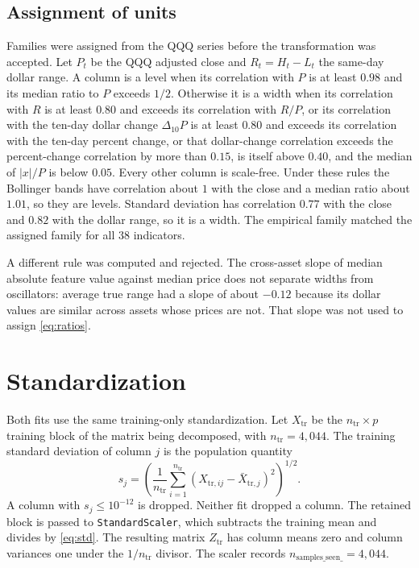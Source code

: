 \documentclass[11pt]{article}
\begin{document}
\subsection{Assignment of units}

Families were assigned from the QQQ series before the transformation was accepted.
Let \(P_t\) be the QQQ adjusted close and \(R_t=H_t-L_t\) the same-day dollar range.
A column is a level when its correlation with \(P\) is at least \(0.98\) and its median ratio to \(P\) exceeds \(1/2\).
Otherwise it is a width when its correlation with \(R\) is at least \(0.80\) and exceeds its correlation with \(R/P\), or its correlation with the ten-day dollar change \(\Delta_{10}P\) is at least \(0.80\) and exceeds its correlation with the ten-day percent change, or that dollar-change correlation exceeds the percent-change correlation by more than \(0.15\), is itself above \(0.40\), and the median of \(|x|/P\) is below \(0.05\).
Every other column is scale-free.
Under these rules the Bollinger bands have correlation about \(1\) with the close and a median ratio about \(1.01\), so they are levels.
Standard deviation has correlation \(0.77\) with the close and \(0.82\) with the dollar range, so it is a width.
The empirical family matched the assigned family for all \(38\) indicators.

A different rule was computed and rejected.
The cross-asset slope of median absolute feature value against median price does not separate widths from oscillators: average true range had a slope of about \(-0.12\) because its dollar values are similar across assets whose prices are not.
That slope was not used to assign \eqref{eq:ratios}.

\section{Standardization}
\label{sec:scale}

Both fits use the same training-only standardization.
Let \(X_{\mathrm{tr}}\) be the \(n_{\mathrm{tr}}\times p\) training block of the matrix being decomposed, with \(n_{\mathrm{tr}}=4{,}044\).
The training standard deviation of column \(j\) is the population quantity
\begin{equation}
\label{eq:std}
s_j=\left(\frac{1}{n_{\mathrm{tr}}}\sum_{i=1}^{n_{\mathrm{tr}}}(X_{\mathrm{tr},ij}-\bar X_{\mathrm{tr},j})^2\right)^{1/2}.
\end{equation}
A column with \(s_j\le 10^{-12}\) is dropped.
Neither fit dropped a column.
The retained block is passed to \texttt{StandardScaler}, which subtracts the training mean and divides by \eqref{eq:std}.
The resulting matrix \(Z_{\mathrm{tr}}\) has column means zero and column variances one under the \(1/n_{\mathrm{tr}}\) divisor.
The scaler records \(n_{\mathrm{samples\_seen\_}}=4{,}044\).
\end{document}
